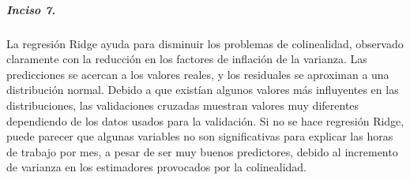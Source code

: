 \documentclass[11pt]{article}
\begin{document}
    \hypertarget{inciso-7.}{%
\subparagraph{Inciso 7.}\label{inciso-7.}}

La regresión Ridge ayuda para disminuir los problemas de colinealidad,
observado claramente con la reducción en los factores de inflación de la
varianza. Las predicciones se acercan a los valores reales, y los
residuales se aproximan a una distribución normal. Debido a que existían
algunos valores más influyentes en las distribuciones, las validaciones
cruzadas muestran valores muy diferentes dependiendo de los datos usados
para la validación. Si no se hace regresión Ridge, puede parecer que
algunas variables no son significativas para explicar las horas de
trabajo por mes, a pesar de ser muy buenos predictores, debido al
incremento de varianza en los estimadores provocados por la
colinealidad.


    
    
    
\end{document}
